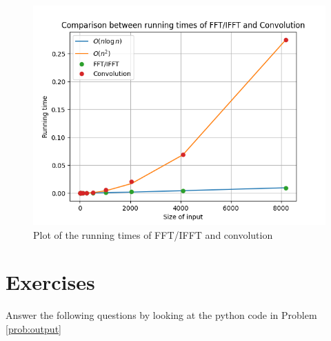\documentclass[journal,12pt,twocolumn]{IEEEtran}
\renewcommand\thesection{\arabic{section}}
\begin{document}
\begin{enumerate}[label=\arabic*.,ref=\thesection.\theenumi]
\begin{figure}[!ht]
	\centering
	\includegraphics[width=\columnwidth]{./figs/7_14.png}
	\caption{Plot of the running times of FFT/IFFT and convolution}
	\label{fig-7_14}	
\end{figure}
\end{enumerate}

\section{Exercises}
Answer the following questions by looking at the python code in Problem \ref{prob:output}
\end{document}
